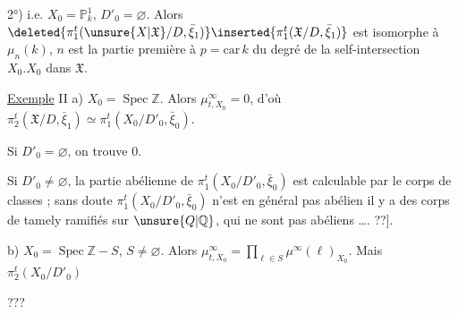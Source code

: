 2°)  i.e. $X_0=\mathbb P^1_k$, $D'_0=\varnothing$. Alors
$\deleted{\pi_1^t(\unsure{X|\mathfrak X}/D,\bar\xi_1)}\inserted{\pi_1^t(\mathfrak X/D,\bar\xi_1)}$ est  isomorphe à
$\mu_n(k)$,  $n$ est la partie première à
$p=\mathrm{car}\,k$ du degré de la self-intersection $X_0.X_0$ dans $\mathfrak X$.

\uline{Exemple} II a) $X_0=\operatorname{Spec}\mathbb Z$.  Alors $\mu^\infty_{t,X_0}=0$,
d'où $\pi^t_2(\mathfrak X/D,\bar\xi_1)\simeq\pi_1^t(X_0/D'_0,\bar\xi_0)$.

 Si $D'_0=\varnothing$, on trouve $0$.

Si $D'_0\ne\varnothing$, la partie abélienne de
$\pi_1^t(X_0/D'_0,\bar\xi_0)$ est calculable par le corps de
classes  ; sans doute $\pi_1^t(X_0/D'_0,\bar\xi_0)$ n'est
en général pas abélien \unsure{[i.e.} il y a des 
 corps de  tamely ramifiés
sur $\unsure{Q|\mathbb Q}$, qui ne sont pas abéliens \ldots. ??].

b) $X_0=\operatorname{Spec}\mathbb Z-S$, $S\ne\varnothing$. Alors
$\mu^\infty_{t,X_0}=\prod_{\ell\in S}\mu^\infty(\ell)_{X_0}$. Mais  $\pi^t_2(X_0/D'_0)$

???
